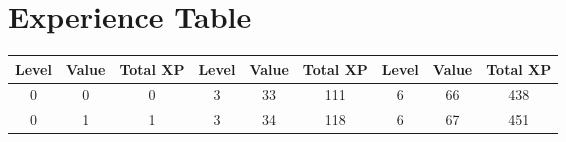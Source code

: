 \section{Experience Table}\label{sec:app-tab-xp}

\begin{center}
\begin{longtable}{ccc|ccc|ccc}
    \hline Level & Value & Total XP & Level & Value & Total XP & Level & Value & Total XP \\ \hline \endhead
    0 & 0 & 0 & 3 & 33 & 111 & 6 & 66 & 438 \\
    0 & 1 & 1 & 3 & 34 & 118 & 6 & 67 & 451 \\
\end{longtable}
\end{center}